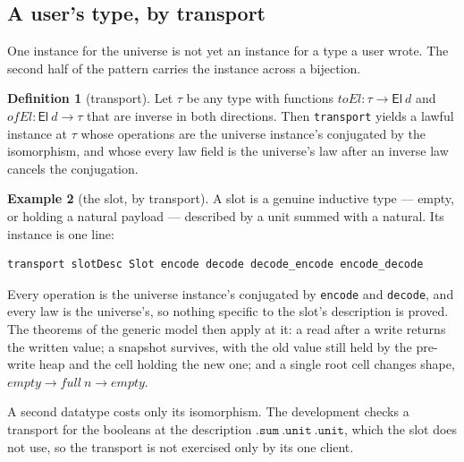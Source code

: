 \documentclass[11pt,a4paper]{article}
\theoremstyle{definition}
\newtheorem{definition}{Definition}[section]
\newtheorem{example}[definition]{Example}
\theoremstyle{plain}
\newcommand{\code}[1]{\texttt{#1}}
\begin{document}
\subsection{A user's type, by transport}

One instance for the universe is not yet an instance for a type a user wrote.
The second half of the pattern carries the instance across a bijection.

\begin{definition}[transport]\label{def:transport}
Let $\tau$ be any type with functions
$\mathit{toEl} : \tau \to \mathsf{El}\ d$ and
$\mathit{ofEl} : \mathsf{El}\ d \to \tau$ that are inverse in both directions.
Then \code{transport} yields a lawful instance at $\tau$ whose operations are the
universe instance's conjugated by the isomorphism, and whose every law field is
the universe's law after an inverse law cancels the conjugation.
\end{definition}

\begin{example}[the slot, by transport]\label{ex:slot}
A slot is a genuine inductive type --- empty, or holding a natural payload ---
described by a unit summed with a natural. Its instance is one line:

\par\medskip\noindent
\begin{minipage}{\linewidth}
\begin{verbatim}
transport slotDesc Slot encode decode decode_encode encode_decode
\end{verbatim}
\end{minipage}
\par\medskip
Every operation is the universe instance's conjugated by \code{encode} and
\code{decode}, and every law is the universe's, so nothing specific to the slot's
description is proved. The theorems of the generic model then apply at it: a read
after a write returns the written value; a snapshot survives, with the old value
still held by the pre-write heap and the cell holding the new one; and a single
root cell changes shape, $\mathit{empty} \to \mathit{full}\ n \to
\mathit{empty}$.

A second datatype costs only its isomorphism. The development checks a transport
for the booleans at the description $\mathtt{.sum}\ \mathtt{.unit}\
\mathtt{.unit}$, which the slot does not use, so the transport is not exercised
only by its one client.
\end{example}
\end{document}
